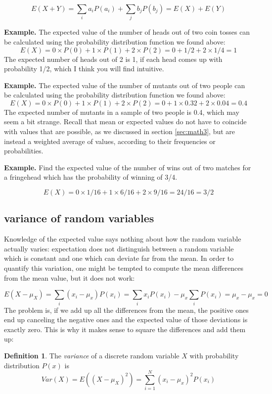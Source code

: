 \documentclass[
]{book}
\theoremstyle{definition}
\newtheorem{definition}{Definition}[chapter]
\theoremstyle{definition}
\theoremstyle{definition}
\theoremstyle{remark}
\begin{document}
\[E(X+Y) =  \sum_i a_i P(a_i) +  \sum_j b_j P(b_j) = E(X) + E(Y) \]

\textbf{Example.} The expected value of the number of heads out of two coin tosses can be calculated using the probability distribution function we found above:
\[ E(X) = 0\times P(0) + 1 \times P(1) + 2 \times P(2) = 0+1/2+2 \times 1/4 = 1\]
The expected number of heads out of 2 is 1, if each head comes up with probability 1/2, which I think you will find intuitive.

\textbf{Example.} The expected value of the number of mutants out of two people can be calculated using the probability distribution function we found above:
\[ E(X) = 0 \times P(0) + 1 \times P(1) + 2 \times P(2) = 0+1 \times 0.32+2 \times 0.04 = 0.4\]
The expected number of mutants in a sample of two people is 0.4, which may seem a bit strange. Recall that mean or expected values do not have to coincide with values that are possible, as we discussed in section \ref{sec:math3}, but are instead a weighted average of values, according to their frequencies or probabilities.

\textbf{Example.} Find the expected value of the number of wins out of two matches for a fringehead which has the probability of winning of 3/4.

\[E(X) = 0 \times 1/16 + 1 \times 6/16 + 2 \times 9/16 = 24/16 = 3/2\]

\hypertarget{variance-of-random-variables}{%
\subsection{variance of random variables}\label{variance-of-random-variables}}

Knowledge of the expected value says nothing about how the random variable actually varies: expectation does not distinguish between a random variable which is constant and one which can deviate far from the mean. In order to quantify this variation, one might be tempted to compute the mean differences from the mean value, but it does not work:

\[ E(X-\mu_X) =  \sum_i (x_i-\mu_x)P(x_i) = \sum_i x_i P(x_i) - \mu_x \sum_i P(x_i) = \mu_x - \mu_x = 0\]
The problem is, if we add up all the differences from the mean, the positive ones end up canceling the negative ones and the expected value of those deviations is exactly zero. This is why it makes sense to square the differences and add them up:

\begin{definition}
\protect\hypertarget{def:def-var-rv}{}{\label{def:def-var-rv} }The \emph{variance} of a discrete random variable \(X\) with probability distribution \(P(x)\) is
\[ Var(X) = E((X-\mu_X)^2) = \sum_{i=1}^N (x_i-\mu_x)^2P(x_i)\]
\end{definition}
\end{document}
